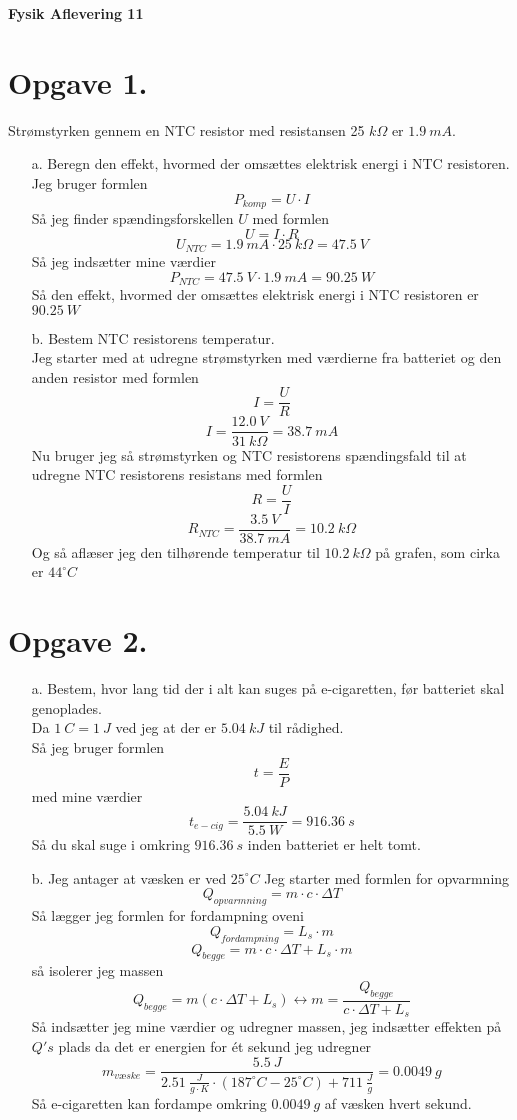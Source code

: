 \documentclass[12pt]{article}
\begin{document}
\Large{\textbf{Fysik Aflevering 11}}
\normalsize

\section*{Opgave 1.}
Strømstyrken gennem en NTC resistor med resistansen 25 $k \Omega$ er $1.9 \ mA$.
\begin{enumerate}
  \item[a.] Beregn den effekt, hvormed der omsættes elektrisk energi i NTC resistoren.\\
  Jeg bruger formlen
  $$P_{komp}=U \cdot I$$
  Så jeg finder spændingsforskellen $U$ med formlen
  $$U=I \cdot R$$
  $$U_{NTC}=1.9 \ mA \cdot 25 \ k \Omega = 47.5 \ V$$
  Så jeg indsætter mine værdier
  $$P_{NTC}= 47.5 \ V \cdot 1.9 \ mA = 90.25 \ W$$
  Så den effekt, hvormed der omsættes elektrisk energi i NTC resistoren er $90.25 \ W$

  \item[b.] Bestem NTC resistorens temperatur.\\
  Jeg starter med at udregne strømstyrken med værdierne fra batteriet og den anden resistor med formlen
  $$I=\frac{U}{R}$$
  $$I=\frac{12.0 \ V}{31 \ k \Omega} = 38.7 \ mA$$
  Nu bruger jeg så strømstyrken og NTC resistorens spændingsfald til at udregne NTC resistorens resistans med formlen
  $$R=\frac{U}{I}$$
  $$R_{NTC}=\frac{3.5 \ V}{38.7 \ mA}=10.2 \ k \Omega$$
  Og så aflæser jeg den tilhørende temperatur til $10.2 \ k \Omega$ på grafen, som cirka er $44^{\circ}C$
\end{enumerate}

\section*{Opgave 2.}
\begin{enumerate}
  \item[a.] Bestem, hvor lang tid der i alt kan suges på e-cigaretten, før batteriet skal genoplades.\\
  Da $1 \ C = 1 \ J$ ved jeg at der er $5.04 \ kJ$ til rådighed.\\
  Så jeg bruger formlen
  $$t=\frac{E}{P}$$
  med mine værdier
  $$t_{e-cig}=\frac{5.04 \ kJ}{5.5 \ W}=916.36 \ s$$
  Så du skal suge i omkring $916.36 \ s$ inden batteriet er helt tomt.

  \item[b.] Jeg antager at væsken er ved $25^{\circ}C$
  Jeg starter med formlen for opvarmning
  $$Q_{opvarmning}=m \cdot c \cdot \Delta T$$
  Så lægger jeg formlen for fordampning oveni
  $$Q_{fordampning}=L_{s} \cdot m$$
  $$Q_{begge}=m \cdot c \cdot \Delta T + L_{s} \cdot m$$
  så isolerer jeg massen
  $$Q_{begge}=m(c \cdot \Delta T + L_{s}) \leftrightarrow m=\frac{Q_{begge}}{c \cdot \Delta T + L_{s}}$$
  Så indsætter jeg mine værdier og udregner massen, jeg indsætter effekten på $Q's$ plads da det er energien for ét sekund jeg udregner
  $$m_{væske}=\frac{5.5 \ J}{2.51 \ \frac{J}{g \cdot K} \cdot (187^{\circ}C-25^{\circ}C) + 711 \ \frac{J}{g}}=0.0049 \ g$$
  Så e-cigaretten kan fordampe omkring $0.0049 \ g$ af væsken hvert sekund.
\end{enumerate}
\end{document}
